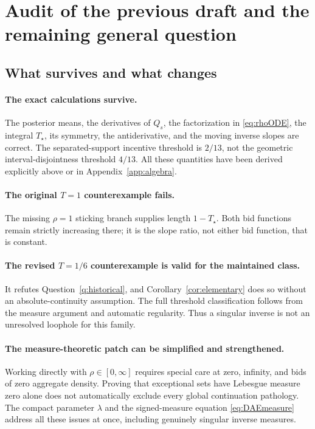 \documentclass[11pt,a4paper]{article}
\numberwithin{equation}{section}
\theoremstyle{definition}
\theoremstyle{remark}
\newcommand{\Ts}{T_\star}
\begin{document}
\section{Audit of the previous draft and the remaining general question}
\label{sec:audit}

\subsection{What survives and what changes}
\paragraph{The exact calculations survive.}
The posterior means, the derivatives of $Q_s$, the factorization in \eqref{eq:rhoODE}, the integral $\Ts$, its symmetry, the antiderivative, and the moving inverse slopes are correct. The separated-support incentive threshold is $2/13$, not the geometric interval-disjointness threshold $4/13$. All these quantities have been derived explicitly above or in Appendix~\ref{app:algebra}.

\paragraph{The original $T=1$ counterexample fails.}
The missing $\rho=1$ sticking branch supplies length $1-\Ts$. Both bid functions remain strictly increasing there; it is the slope ratio, not either bid function, that is constant.

\paragraph{The revised $T=1/6$ counterexample is valid for the maintained class.}
It refutes Question~\ref{q:historical}, and Corollary~\ref{cor:elementary} does so without an absolute-continuity assumption. The full threshold classification follows from the measure argument and automatic regularity. Thus a singular inverse is not an unresolved loophole for this family.

\paragraph{The measure-theoretic patch can be simplified and strengthened.}
Working directly with $\rho\in[0,\infty]$ requires special care at zero, infinity, and bids of zero aggregate density. Proving that exceptional sets have Lebesgue measure zero alone does not automatically exclude every global continuation pathology. The compact parameter $\lambda$ and the signed-measure equation \eqref{eq:DAEmeasure} address all these issues at once, including genuinely singular inverse measures.
\end{document}
